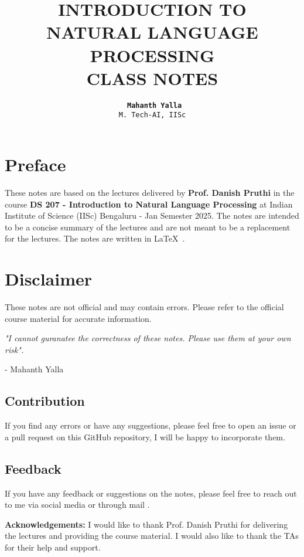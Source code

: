 \documentclass{report}
\title{\textsf{ \huge INTRODUCTION TO} \\\huge{{\bf NATURAL LANGUAGE PROCESSING}}\\\textsf{\large CLASS NOTES}}
\author{\huge{\bf \texttt{ Mahanth Yalla}}\\ \texttt{\large M. Tech-AI, IISc}}
\date{}
\begin{document}
\maketitle
\newpage
{}

\section*{Preface}
These notes are based on the lectures delivered by {\bf Prof. Danish Pruthi} in the course {\bf DS 207 - Introduction to Natural Language Processing} 
at Indian Institute of Science (IISc) Bengaluru - Jan Semester 2025. 
The notes are intended to be a concise summary of the lectures and are not meant to be a replacement for the lectures. 
The notes are written in \LaTeX\ . 

\section*{Disclaimer}
These notes are not official and may contain errors. Please refer to the official course material for accurate information.

\textit{"I cannot guranatee the correctness of these notes. Please use them at your own risk".}

\hfill- Mahanth Yalla 

\subsection*{Contribution}
If you find any errors or have any suggestions, please feel free to open an issue or a pull request on this GitHub repository, I will be happy to incorporate them.
\subsection*{Feedback}
If you have any feedback or suggestions on the notes, please feel free to reach out to me via social media or through mail  .

\vfill
{\bf Acknowledgements:} I would like to thank Prof. Danish Pruthi for delivering the lectures and providing the course material. I would also like to thank the TAs for their help and support.


\tableofcontents
\pagebreak
\end{document}
